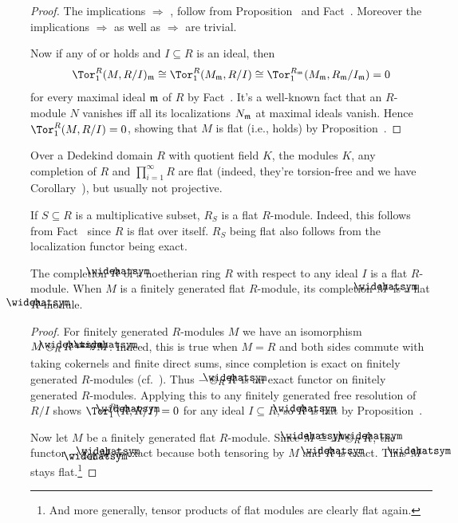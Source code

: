 \documentclass[a4paper,parskip=half,numbers=enddot, DIV=12]{scrreprt}
\begin{document}
\begin{proof}
	The implications  $\Rightarrow$ ,  follow from Proposition~ and Fact~. Moreover the implications  $\Rightarrow$  as well as  $\Rightarrow$  are trivial.
	
	Now if any of  or  holds and $I\subseteq R$ is an ideal, then
	\begin{align*}
		\Tor_1^R(M,R/I)_\mm\cong \Tor_1^R(M_\mm,R/I)\cong \Tor_1^{R_\mm}(M_\mm,R_\mm/I_\mm)=0
	\end{align*}
	for every maximal ideal $\mathfrak{m}$ of $R$ by Fact~. It's a well-known fact that an $R$-module $N$ vanishes iff all its localizations $N_{\mathfrak{m}}$ at maximal ideals vanish. Hence $\Tor_1^R(M,R/I)=0$, showing that $M$ is flat (i.e.,  holds) by Proposition~.
\end{proof}
\begin{example}
	Over a Dedekind domain $R$ with quotient field $K$, the modules $K$, any completion of $R$ and $\prod_{i=1}^{\infty}R$ are flat (indeed, they're torsion-free and we have Corollary~), but usually not projective.
\end{example}
\begin{example}
	If $S\subseteq R$ is a multiplicative subset, $R_S$ is a flat $R$-module. Indeed, this follows from Fact~ since $R$ is flat over itself. $R_S$ being flat also follows from the localization functor being exact.
\end{example}
\begin{example}
	The completion $\roof{R}$ of a noetherian ring $R$ with respect to any ideal $I$ is a flat $R$-module. When $M$ is a finitely generated flat $R$-module, its completion $\roof{M}$ is a flat $\roof{R}$-module.
\end{example}
\begin{proof}
	For finitely generated $R$-modules $M$ we have an isomorphism $M\otimes_R\roof{R}\isomorphism \roof{M}$. Indeed, this is true when $M=R$ and both sides commute with taking cokernels and finite direct sums, since completion is exact on finitely generated $R$-modules (cf.\ \cite[Lemma~7.15]{eisenbudCommAlg}). Thus $-\otimes_R\roof{R}$ is an exact functor on finitely generated $R$-modules. Applying this to any finitely generated free resolution of $R/I$ shows $\Tor_1^R(\roof{R},R/I)=0$ for any ideal $I\subseteq R$, so $\roof{R}$ is flat by Proposition~.
	
	Now let $M$ be a finitely generated flat $R$-module. Since $\roof{M}\cong M\otimes_R\roof{R}$, the functor $-\otimes_{\roof{R}}\roof{M}$ is exact because both tensoring by $M$ and $\roof{R}$ is exact. Thus $\roof{M}$ stays flat.\footnote{And more generally, tensor products of flat modules are clearly flat again.}
\end{proof}
\end{document}
